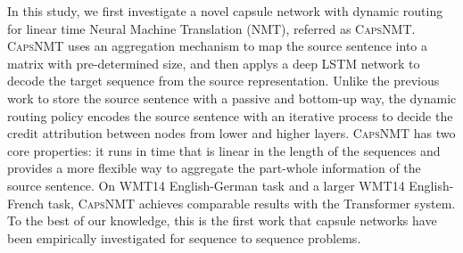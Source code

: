 In this study, we  first investigate a novel capsule network
with dynamic routing for linear time Neural  Machine Translation (NMT), referred as
\textsc{CapsNMT}.
\textsc{CapsNMT}
uses an aggregation mechanism to map the source sentence into a matrix with pre-determined
size, and then applys a deep LSTM network to decode the
target sequence from the source representation.
Unlike the previous
work \cite{sutskever2014sequence} to store
the  source sentence with a passive and bottom-up way,
the dynamic routing policy encodes the source sentence with
an iterative process to
decide the credit attribution between nodes from lower and higher layers.
\textsc{CapsNMT} has two core properties:
it runs in time that is linear in the length of the sequences
and
provides a more flexible way to aggregate the part-whole information of the source
sentence.
On WMT14 English-German task and a larger WMT14 English-French task, \textsc{CapsNMT} achieves comparable results
with the Transformer system.
To the best of our knowledge, this is the first work that capsule networks have been empirically investigated
for  sequence to sequence problems.
